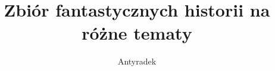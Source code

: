 \documentclass[a4paper,oneside,12pt]{book}
\begin{document}
\title{Zbiór fantastycznych historii na różne tematy}
\author{Antyradek}
\maketitle
\tableofcontents
	
	
	
	
	
	
	
	
	
	
\end{document}
